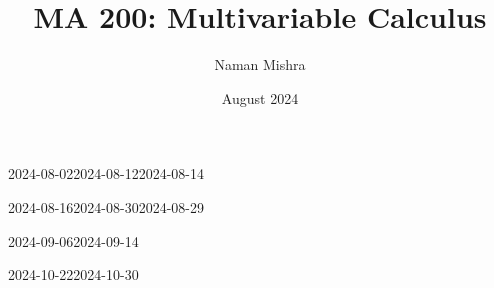 \documentclass[12pt]{report}
\title{MA 200: Multivariable Calculus}
\author{Naman Mishra}
\date{August 2024}
\begin{document}
\maketitle
\tableofcontents
\newpage
\listoflecture
\listofhw
    
    
    
    
    \small{}
        {2024-08-02}{2024-08-12}{2024-08-14}\normalsize
    
    
    
    
    
    
    \small{}
        {2024-08-16}{2024-08-30}{2024-08-29}\normalsize
    
    
    
    
    
    
    
    
    
    
    \small{}
        {2024-09-06}{2024-09-14}{}\normalsize
    
    
    
    \small{}
        {2024-10-22}{2024-10-30}{}\normalsize
\end{document}
